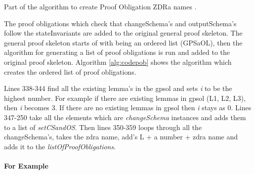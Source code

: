 
\begin{algorithm}[h]
\BlankLine
{}
\caption{Part of the algorithm to create Proof Obligation ZDRa names \label{alg:codepob}.}
\end{algorithm}

The proof obligations which check that changeSchema's and outputSchema's follow the stateInvariants are added to the original general proof skeleton. The general proof skeleton starts of with being an ordered list (GPSaOL), then the algorithm for generating a list of proof obligations is run and added to the original proof skeleton. Algorithm \ref{alg:codepob} shows the algorithm which creates the ordered list of proof obligations.

Lines 338-344 find all the existing lemma's in the \gls{gpsol} and sets \emph{i} to be the highest number. For example if there are existing lemmas in \gls{gpsol} (L1, L2, L3), then \emph{i} becomes 3. If there are no existing lemmas in \gls{gpsol} then \emph{i} stays as 0. Lines 347-250 take all the elements which are \emph{changeSchema} instances and adds them to a list of \emph{setCSandOS}. Then lines 350-359 loops through all the changeSchema's, takes the \gls{zdra} name, add's L + a number + \gls{zdra} name and adds it to the \emph{listOfProofObligations}.

\paragraph{For Example}

